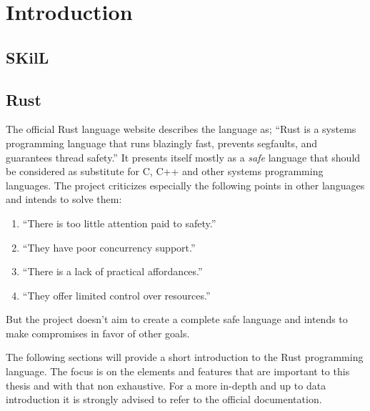 \documentclass[thesis]{subfiles}
\begin{document}
\chapter{Introduction}

\section{SKilL}

\section{Rust}

  The official Rust language website describes the language as;
  \enquote{Rust is a systems programming language that runs blazingly fast, prevents segfaults, and guarantees thread safety.}\autocite{rustorg}
  It presents itself mostly as a \emph{safe} language that should be considered as substitute for C, C++ and other systems programming languages.
  The project criticizes especially the following points in other languages and intends to solve them:
  \begin{enumerate}
    \item \enquote{There is too little attention paid to safety.}\autocite{rustorg}
    \item \enquote{They have poor concurrency support.}\autocite{rustorg}
    \item \enquote{There is a lack of practical affordances.}\autocite{rustorg}
    \item \enquote{They offer limited control over resources.}\autocite{rustorg}
  \end{enumerate}
  But the project doesn't aim to create a complete safe language and intends to make compromises in favor of other goals.

  The following sections will provide a short introduction to the Rust programming language.
  The focus is on the elements and features that are important to this thesis and with that non exhaustive.
  For a more in-depth and up to data introduction it is strongly advised to refer to the official documentation.
\end{document}
